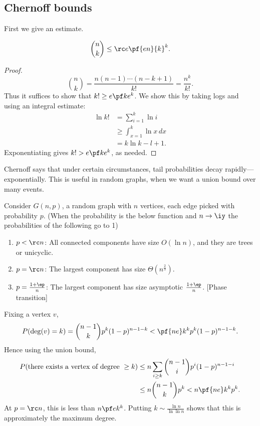 
\subsection{Chernoff bounds}
First we give an estimate.
\begin{lem}
\[
\binom nk \le \rc e\pf{en}{k}^k.
\]
\end{lem}
\begin{proof}
\[
\binom nk=\frac{n(n-1)\cdots (n-k+1)}{k!}=\frac{n^k}{k!}.
\]
Thus it suffices to show that $k!\ge e\pf ke^k$. We show this by taking logs and using an integral estimate:
\begin{align*}
\ln k!&=\sum_{i=1}^k \ln i\\
&\ge \int_{x=1}^k\ln x\,dx\\
&=k\ln k-l+1.
\end{align*}
Exponentiating gives $k!>e\pf ke^k$, as needed.
\end{proof}

Chernoff says that under certain circumstances, tail probabilities decay rapidly---exponentially. This is useful in random graphs, when we want a union bound over many events.

Consider $G(n,p)$, a random graph with $n$ vertices, each edge picked with probability $p$. (When the probability is the below function and $n\to \iy$ the probabilities of the following go to 1)
\begin{enumerate}
\item $p<\rc n$: All connected components have size $O(\ln n)$, and they are trees or unicyclic.
\item $p=\rc n$: The largest component has size $\Theta(n^{\frac 23})$.
\item $p=\frac{1+\ep}{n}$: The largest component has size asymptotic $\frac{1+\ep}n$. [Phase transition]
\end{enumerate}
Fixing a vertex $v$,
\[
P(\deg(v)=k)=\binom{n-1}k p^k(1-p)^{n-1-k} <\pf{ne}k^kp^k(1-p)^{n-1-k}.
\]
Hence using the union bound,
\begin{align*}
P(\text{there exists a vertex of degree }\ge k)
&\le n\sum_{i\ge k} \binom{n-1}i p^i (1-p)^{n-1-i}\\
&\le n\binom{n-1}{k}p^k <n\pf{ne}k^k p^k.
\end{align*}
At $p=\rc n$, this is less than $n\pf ek^k$. Putting $k\sim \frac{\ln n}{\ln\ln n}$ shows that this is approximately the maximum degree.

